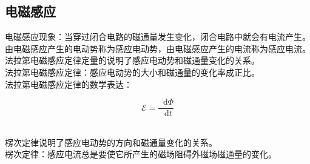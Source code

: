 \documentclass[UTF8]{ctexart}
\newcommand*{\dif}{\mathop{}\!\mathrm{d}}
\begin{document}
\subsection{电磁感应}
    电磁感应现象：当穿过闭合电路的磁通量发生变化，闭合电路中就会有电流产生。\\[2mm]
    由电磁感应产生的电动势称为感应电动势，由电磁感应产生的电流称为感应电流。\\[4mm]
    法拉第电磁感应定律定量的说明了感应电动势和磁通量变化的关系。\\[3mm]
    法拉第电磁感应定律：感应电动势的大小和磁通量的变化率成正比。\\[3mm]
    法拉第电磁感应定律的数学表达：
    \begin{large}
        \begin{equation*}
            \mathscr{E}=\frac{\dif\Phi}{\dif t}
        \end{equation*}
    \end{large}\\
    楞次定律说明了感应电动势的方向和磁通量变化的关系。\\[3mm]
    楞次定律：感应电流总是要使它所产生的磁场阻碍外磁场磁通量的变化。\\
\end{document}
